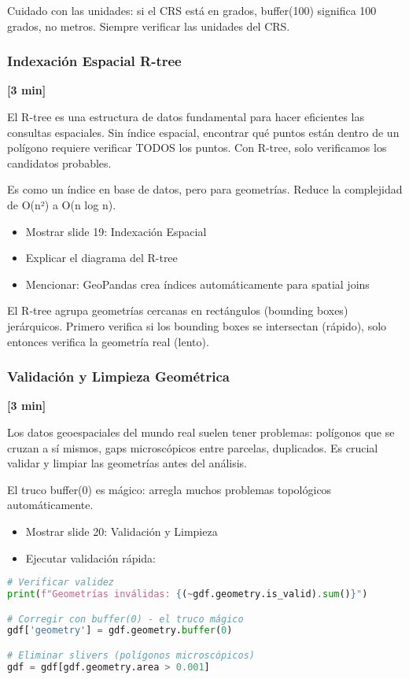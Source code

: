 \documentclass[11pt,a4paper]{article}
\newcommand{\tiempo}[1]{\textcolor{timecolor}{\textbf{[#1]}}}
\newcommand{\decir}[1]{\begin{tcolorbox}[colback=blue!5,colframe=usachblue,title={DECIR}]#1\end{tcolorbox}}
\newcommand{\hacer}[1]{\begin{tcolorbox}[colback=green!5,colframe=green!50!black,title={HACER}]#1\end{tcolorbox}}
\newcommand{\nota}[1]{\begin{tcolorbox}[colback=yellow!10,colframe=orange,title={NOTA}]#1\end{tcolorbox}}
\newcommand{\alerta}[1]{\begin{tcolorbox}[colback=red!5,colframe=red,title={ALERTA}]#1\end{tcolorbox}}
\begin{document}
\alerta{
Cuidado con las unidades: si el CRS está en grados, buffer(100) significa 100 grados, no metros. Siempre verificar las unidades del CRS.
}

\subsubsection{Indexación Espacial R-tree} \tiempo{3 min}

\decir{
El R-tree es una estructura de datos fundamental para hacer eficientes las consultas espaciales. Sin índice espacial, encontrar qué puntos están dentro de un polígono requiere verificar TODOS los puntos. Con R-tree, solo verificamos los candidatos probables.

Es como un índice en base de datos, pero para geometrías. Reduce la complejidad de O(n²) a O(n log n).
}

\hacer{
\begin{itemize}
    \item Mostrar slide 19: Indexación Espacial
    \item Explicar el diagrama del R-tree
    \item Mencionar: GeoPandas crea índices automáticamente para spatial joins
\end{itemize}
}

\nota{
El R-tree agrupa geometrías cercanas en rectángulos (bounding boxes) jerárquicos. Primero verifica si los bounding boxes se intersectan (rápido), solo entonces verifica la geometría real (lento).
}

\subsubsection{Validación y Limpieza Geométrica} \tiempo{3 min}

\decir{
Los datos geoespaciales del mundo real suelen tener problemas: polígonos que se cruzan a sí mismos, gaps microscópicos entre parcelas, duplicados. Es crucial validar y limpiar las geometrías antes del análisis.

El truco buffer(0) es mágico: arregla muchos problemas topológicos automáticamente.
}

\hacer{
\begin{itemize}
    \item Mostrar slide 20: Validación y Limpieza
    \item Ejecutar validación rápida:
\end{itemize}
}

\begin{lstlisting}[language=Python]
# Verificar validez
print(f"Geometrías inválidas: {(~gdf.geometry.is_valid).sum()}")

# Corregir con buffer(0) - el truco mágico
gdf['geometry'] = gdf.geometry.buffer(0)

# Eliminar slivers (polígonos microscópicos)
gdf = gdf[gdf.geometry.area > 0.001]
\end{lstlisting}
\end{document}
